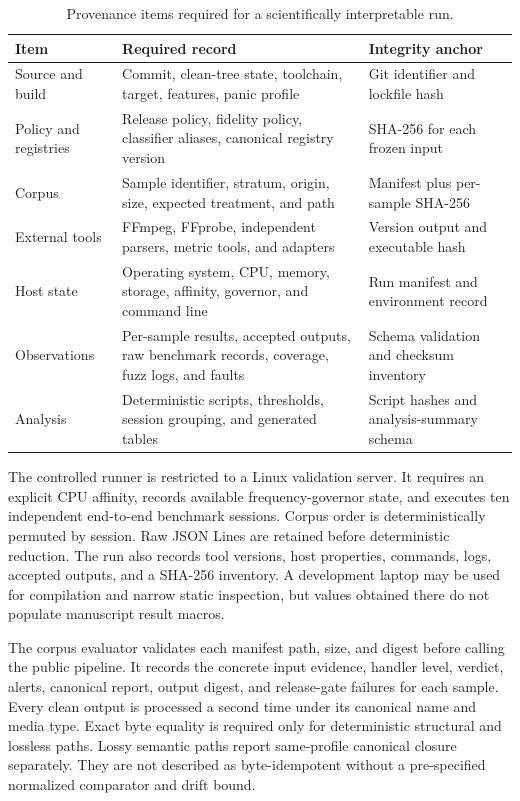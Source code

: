 \begin{table}[t]
\centering
\caption{Provenance items required for a scientifically interpretable run.}
\label{tab:reproducibility-register}
\small
\begin{tabularx}{\textwidth}{L{0.24\textwidth}Y L{0.25\textwidth}}
\toprule
Item & Required record & Integrity anchor \\
\midrule
Source and build & Commit, clean-tree state, toolchain, target, features, panic profile & Git identifier and lockfile hash \\
Policy and registries & Release policy, fidelity policy, classifier aliases, canonical registry version & SHA-256 for each frozen input \\
Corpus & Sample identifier, stratum, origin, size, expected treatment, and path & Manifest plus per-sample SHA-256 \\
External tools & FFmpeg, FFprobe, independent parsers, metric tools, and adapters & Version output and executable hash \\
Host state & Operating system, CPU, memory, storage, affinity, governor, and command line & Run manifest and environment record \\
Observations & Per-sample results, accepted outputs, raw benchmark records, coverage, fuzz logs, and faults & Schema validation and checksum inventory \\
Analysis & Deterministic scripts, thresholds, session grouping, and generated tables & Script hashes and analysis-summary schema \\
\bottomrule
\end{tabularx}
\end{table}

The controlled runner is restricted to a Linux validation server. It requires
an explicit CPU affinity, records available frequency-governor state, and
executes ten independent end-to-end benchmark sessions. Corpus
order is deterministically permuted by session. Raw JSON Lines are retained
before deterministic reduction. The run also records tool versions, host
properties, commands, logs, accepted outputs, and a SHA-256 inventory. A
development laptop may be used for compilation and narrow static inspection,
but values obtained there do not populate manuscript result macros.

The corpus evaluator validates each manifest path, size, and digest before
calling the public pipeline. It records the concrete input evidence, handler
level, verdict, alerts, canonical report, output digest, and release-gate
failures for each sample. Every clean output is processed a second time under
its canonical name and media type. Exact byte equality is required only for
deterministic structural and lossless paths. Lossy semantic paths report
same-profile canonical closure separately. They are not described as
byte-idempotent without a pre-specified normalized comparator and drift bound.

